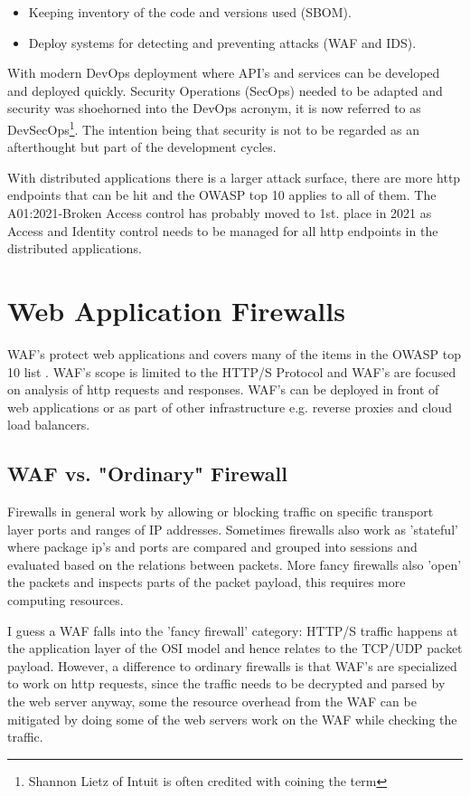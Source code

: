 \documentclass[
	letterpaper, %
	10pt, %
	unnumberedsections, %
	twoside, %
]{APAAssignment}
\begin{document}
\begin{itemize}
	\item Keeping inventory of the code and versions used (SBOM). 
	\item Deploy systems for detecting and preventing attacks (WAF and IDS).
\end{itemize}

With modern DevOps deployment where API's and services can be developed and deployed quickly. Security Operations (SecOps) needed to be adapted and security was shoehorned into the DevOps acronym, it is now referred to as DevSecOps\footnote{Shannon Lietz of Intuit is often credited with coining the term\cite{DevSecOps}}. The intention being that security is not to be regarded as an afterthought but part of the development cycles.  

With distributed applications there is a larger attack surface, there are more http endpoints that can be hit and the OWASP top 10 applies to all of them. The A01:2021-Broken Access control \cite{OWASPtop10} has probably moved to 1st. place in 2021 as Access and Identity control needs to be managed for all http endpoints in the distributed applications.       

\section{Web Application Firewalls}
WAF's protect web applications and covers many of the items in the OWASP top 10 list \cite{OWASPtop10}. WAF's scope is limited to the HTTP/S Protocol and WAF's are focused on analysis of http requests and responses. WAF's can be deployed in front of web applications or as part of other infrastructure e.g. reverse proxies and cloud load balancers.   

\subsection{WAF vs. "Ordinary" Firewall}
Firewalls in general work by allowing or blocking traffic on specific transport layer ports and ranges of IP addresses. Sometimes firewalls also work as 'stateful' where package ip's and ports are compared and grouped into sessions and evaluated based on the relations between packets. More fancy firewalls also 'open' the packets and inspects parts of the packet payload, this requires more computing resources. 

I guess a WAF falls into the 'fancy firewall' category: HTTP/S traffic happens at the application layer of the OSI model and hence relates to the TCP/UDP packet payload. However, a difference to ordinary firewalls is that WAF's are specialized to work on http requests, since the traffic needs to be decrypted and parsed by the web server anyway, some the resource overhead from the WAF can be mitigated by doing some of the web servers work on the WAF while checking the traffic.    
\end{document}
